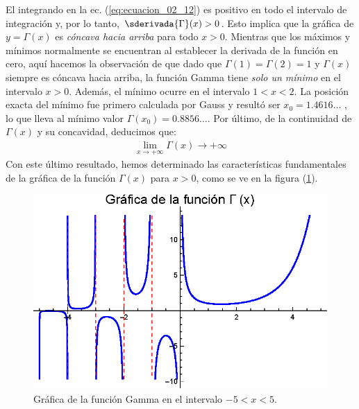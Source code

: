 El integrando en la ec. (\ref{eq:ecuacion_02_12}) es positivo en todo el intervalo de integración y, por lo tanto, $\sderivada{\Gamma} (x) > 0$. Esto implica que la gráfica de $y = \Gamma (x)$ es \emph{cóncava hacia arriba} para todo $x > 0$. Mientras que los máximos y mínimos normalmente se encuentran al establecer la derivada de la función en cero, aquí hacemos la observación de que dado que $\Gamma (1) = \Gamma (2) = 1$ y $\Gamma (x)$ siempre es cóncava hacia arriba, la función Gamma tiene \emph{solo un mínimo} en el intervalo $x > 0$. Además, el mínimo ocurre en el intervalo $1 < x < 2$. La posición exacta del mínimo fue primero calculada por Gauss y resultó ser $x_{0} = 1.4616\ldots$ , lo que lleva al mínimo valor $\Gamma (x_{0}) = 0.8856\ldots$. Por último, de la continuidad de $\Gamma (x)$ y su concavidad, deducimos que:
\begin{align}
\lim_{x \to +\infty} \Gamma (x) \to +\infty
\label{eq:ecuacion_02_13}
\end{align}
Con este último resultado, hemos determinado las características fundamentales de la gráfica de la función $\Gamma (x)$ para $x > 0$, como se ve en la figura (\ref{fig:figura_02_01}).
\begin{figure}[H]
    \centering
    \includegraphics[scale=1]{Imagenes/Plot_Gamma_01.eps}
    \caption{Gráfica de la función Gamma en el intervalo $-5 < x < 5$.}
    \label{fig:figura_02_01}
\end{figure}

